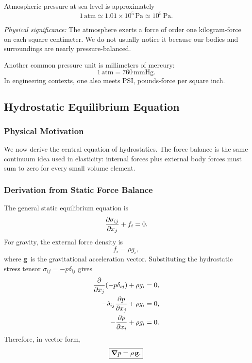\documentclass[../main.tex]{subfiles}
\begin{document}
Atmospheric pressure at sea level is approximately
\begin{equation}
  \boxed{1\,\mathrm{atm}\simeq 1.01\times 10^5\,\mathrm{Pa}\simeq 10^5\,\mathrm{Pa}.}
  \label{eq:lec10_atmosphere}
\end{equation}

\textit{Physical significance:} The atmosphere exerts a force of order one kilogram-force on each square centimeter. We do not usually notice it because our bodies and surroundings are nearly pressure-balanced.

Another common pressure unit is millimeters of mercury:
\begin{equation}
  \boxed{1\,\mathrm{atm}=760\,\mathrm{mmHg}.}
  \label{eq:lec10_mmhg}
\end{equation}
In engineering contexts, one also meets PSI, pounds-force per square inch.

\subsection{Hydrostatic Equilibrium Equation}\label{sec:lec10:hydrostatic-equilibrium}

\subsubsection*{Physical Motivation}
We now derive the central equation of hydrostatics. The force balance is the same continuum idea used in elasticity: internal forces plus external body forces must sum to zero for every small volume element.

\subsubsection*{Derivation from Static Force Balance}
The general static equilibrium equation is
\begin{equation}
  \pdv{\sigma_{ij}}{x_j}+f_i=0.
  \label{eq:lec10_general_static_balance}
\end{equation}
For gravity, the external force density is
\begin{equation}
  f_i=\rho g_i,
  \label{eq:lec10_gravity_force_density}
\end{equation}
where $\mathbf{g}$ is the gravitational acceleration vector. Substituting the hydrostatic stress tensor $\sigma_{ij}=-p\delta_{ij}$ gives
\begin{align}
  \pdv{}{x_j}\qty(-p\delta_{ij})+\rho g_i &= 0,
  \label{eq:lec10_hydrostatic_derivation_1}\\
  -\delta_{ij}\pdv{p}{x_j}+\rho g_i &= 0,
  \label{eq:lec10_hydrostatic_derivation_2}\\
  -\pdv{p}{x_i}+\rho g_i &= 0.
  \label{eq:lec10_hydrostatic_derivation_3}
\end{align}
Therefore, in vector form,
\begin{equation}
  \boxed{\grad p=\rho\,\mathbf{g}.}
  \label{eq:lec10_hydrostatic_equilibrium}
\end{equation}
\end{document}

